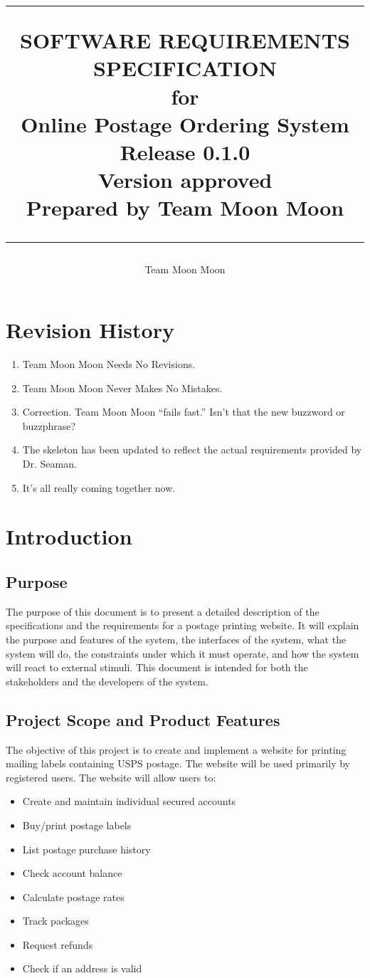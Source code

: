 \documentclass{scrreprt}
\title{%
\flushright
\rule{16cm}{5pt}\vskip1cm
\Huge{SOFTWARE REQUIREMENTS\\ SPECIFICATION}\\
\vspace{2cm}
for\\
\vspace{2cm}
Online Postage Ordering System\\
\vspace{2cm}
\LARGE{Release 0.1.0\\}
\vspace{2cm}
\LARGE{Version \myversion approved\\}
\vspace{2cm}
Prepared by Team Moon Moon\\
\vfill
\rule{16cm}{5pt}
}
\date{}
\author{Team Moon Moon}
\begin{document}
\maketitle
\tableofcontents

\chapter*{Revision History}

\begin{enumerate}
\item Team Moon Moon Needs No Revisions.
\item Team Moon Moon Never Makes No Mistakes.
\item Correction. Team Moon Moon ``fails fast.'' Isn't that the new 
buzzword or buzzphrase?
\item The skeleton has been updated to reflect the actual requirements 
provided by Dr. Seaman.
\item It's all really coming together now.
\end{enumerate}

\chapter{Introduction}

\section{Purpose}

The purpose of this document is to present a detailed description of the
speciﬁcations and the requirements for a postage printing website. It will
explain the purpose and features of the system, the interfaces of the system,
what the system will do, the constraints under which it must operate, and how
the system will react to external stimuli. This document is intended for both
the stakeholders and the developers of the system.

\section{Project Scope and Product Features}

The objective of this project is to create and implement a website for printing
mailing labels containing USPS postage. The website will be used primarily by
registered users. The website will allow users to: 

\begin{itemize}
\item Create and maintain individual secured accounts
\item Buy/print postage labels
\item List postage purchase history
\item Check account balance
\item Calculate postage rates
\item Track packages
\item Request refunds
\item Check if an address is valid
\end{itemize}
\end{document}
